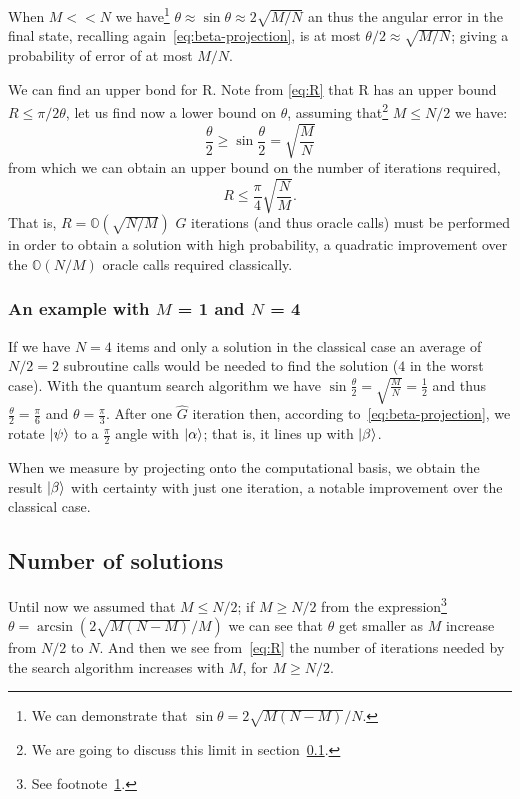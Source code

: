 When $M<<N$ we have\footnote{\label{foot:sin}We can demonstrate that $\sin\theta = 2\sqrt{M(N-M)}/N$.} $\theta \approx \sin\theta \approx 2\sqrt{M/N}$ an thus the angular error in the final state, recalling again~\ref{eq:beta-projection}, is at most $\theta/2 \approx \sqrt{M/N}$; giving a probability of error of at most $M/N$.

We can find an upper bond for R. Note from \ref{eq:R}  that R has an upper bound $R \leq \pi/2\theta$, let us find now a lower bound on $\theta$, assuming that\footnote{We are going to discuss this limit in section~\ref{sec:M}.} $M \leq N/2$ we have:
\begin{equation*}
    \frac{\theta}{2} \geq \sin\frac{\theta}{2} = \sqrt{\frac{M}{N}}
\end{equation*}
from which we can obtain an upper bound on the number of iterations required,
\begin{equation}\label{eq:upper-bound}
    R \leq \frac{\pi}{4} \sqrt{\frac{N}{M}}.
\end{equation}
That is, $R = \mathbb{O}(\sqrt{N/M})$ $G$ iterations (and thus oracle calls) must be performed in order to obtain a solution with high probability, a quadratic improvement over the $\mathbb{O}(N/M)$ oracle calls required classically.

\subsubsection{An example with $M$ = 1 and $N$ = 4}
If we have $N = 4$ items and only a solution in the classical case an average of $N/2 = 2$ subroutine calls would be needed to find the solution ($4$ in the worst case).
With the quantum search algorithm we have $\sin{\frac{\theta}{2}} = \sqrt{\frac{M}{N}} = \frac{1}{2}$ and thus $\frac{\theta}{2} = \frac{\pi}{6}$ and $\theta = \frac{\pi}{3}$. After one $\hat{G}$ iteration then, according to~\ref{eq:beta-projection}, we rotate $\ket{\psi}$ to a $\frac{\pi}{2}$ angle with $\ket{\alpha}$; that is, it lines up with $\ket{\beta}$.

When we measure by projecting onto the computational basis, we obtain the result $\ket{\beta}$ with certainty with just one iteration, a notable improvement over the classical case.

\subsection{Number of solutions}\label{sec:M}
Until now we assumed that $M\leq N/2$; if $M \geq N/2$ from the expression\footnote{See footnote~\ref{foot:sin}.} $\theta=\arcsin(2\sqrt{M(N-M)}/M)$ we can see that $\theta$ get smaller as $M$ increase from $N/2$ to $N$. And then we see from~\ref{eq:R} the number of iterations needed by the search algorithm increases with $M$, for $M\geq N/2$.

